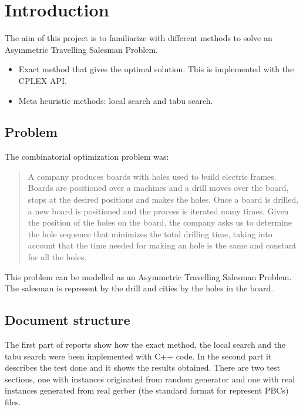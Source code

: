 \section{Introduction}
	The aim of this project is to familiarize with different methods to solve an Asymmetric Travelling Salesman Problem.
	\begin{itemize}
		\item Exact method that gives the optimal solution. This is implemented with the CPLEX API.
		\item Meta heuristic methods: local search and tabu search.
	\end{itemize}

	\subsection{Problem}
		The combinatorial optimization problem was:
		\begin{quote}
				A company produces boards with holes used to build electric frames.  Boards are positioned over a machines and a drill moves over the board, stops at the desired positions and makes the holes.  Once a board is drilled, a new board is positioned and the process is iterated many times.  Given the position of the holes on the board, the company asks us to determine the hole sequence that minimizes the total drilling time, taking into account that the time needed for making an hole is the same and constant for all the holes.
		\end{quote}
	
		This problem can be modelled as an Asymmetric Travelling Salesman Problem. The salesman is represent by the drill and cities by the holes in the board.
	
	\subsection{Document structure}
		The first part of reports show how the exact method, the local search and the tabu search were been implemented with C++ code. In the second part it describes the test done and it shows the results obtained. There are two test sections, one with instances originated from random generator and one with real instances generated from real gerber (the standard format for represent PBCs) files.